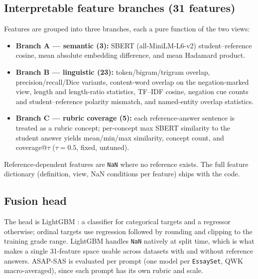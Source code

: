 \documentclass[11pt]{article}
\begin{document}
\subsection{Interpretable feature branches (31 features)}
Features are grouped into three branches, each a pure function of the two
views:
\begin{itemize}
  \item \textbf{Branch A --- semantic (3):} SBERT \cite{reimers2019sentencebert}
        (all-MiniLM-L6-v2) student--reference cosine, mean absolute embedding
        difference, and mean Hadamard product.
  \item \textbf{Branch B --- linguistic (23):} token/bigram/trigram overlap,
        precision/recall/Dice variants, content-word overlap on the
        negation-marked view, length and length-ratio statistics, TF--IDF
        cosine, negation cue counts and student--reference polarity mismatch,
        and named-entity overlap statistics.
  \item \textbf{Branch C --- rubric coverage (5):} each reference-answer
        sentence is treated as a rubric concept; per-concept max SBERT
        similarity to the student answer yields mean/min/max similarity,
        concept count, and coverage@$\tau$ ($\tau{=}0.5$, fixed, untuned).
\end{itemize}
Reference-dependent features are \texttt{NaN} where no reference exists. The
full feature dictionary (definition, view, NaN conditions per feature) ships
with the code.

\subsection{Fusion head}
The head is LightGBM \cite{ke2017lightgbm}: a classifier for categorical
targets and a regressor otherwise; ordinal targets use regression followed by
rounding and clipping to the training grade range. LightGBM handles
\texttt{NaN} natively at split time, which is what makes a single 31-feature
space usable across datasets with and without reference answers. ASAP-SAS is
evaluated per prompt (one model per \texttt{EssaySet}, QWK macro-averaged),
since each prompt has its own rubric and scale.
\end{document}
